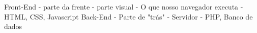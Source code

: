 Front-End
    - parte da frente
    - parte visual
    - O que nosso navegador executa
    - HTML, CSS, Javascript
Back-End
    - Parte de "trás"
    - Servidor
    - PHP, Banco de dados
